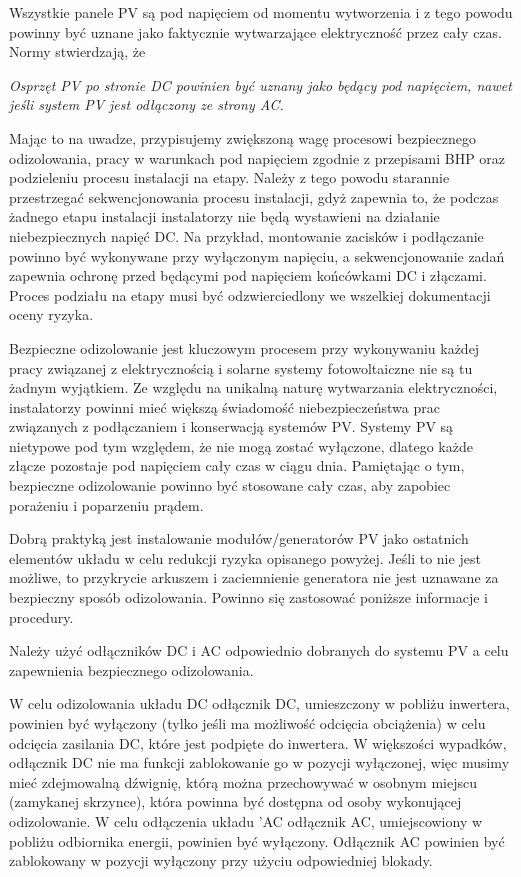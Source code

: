 \documentclass[12pt,a4paper]{article}
\begin{document}
Wszystkie panele PV są pod napięciem od momentu wytworzenia i z tego 
powodu powinny być uznane jako faktycznie wytwarzające elektryczność 
przez cały czas. Normy stwierdzają, że 
\begin{displayquote}
\textit{Osprzęt PV po stronie DC powinien być uznany jako będący pod napięciem, nawet jeśli system PV jest odłączony ze strony AC.}
\end{displayquote}
Mając to na uwadze, przypisujemy 
zwiększoną wagę procesowi bezpiecznego odizolowania, pracy w warunkach 
pod napięciem zgodnie z przepisami BHP oraz podzieleniu procesu 
instalacji na etapy. Należy z tego powodu starannie przestrzegać 
sekwencjonowania procesu instalacji, gdyż zapewnia to, że podczas 
żadnego etapu instalacji instalatorzy nie będą wystawieni na działanie niebezpiecznych napięć DC. 
Na przykład, montowanie zacisków i podłączanie powinno być wykonywane 
przy wyłączonym napięciu, a sekwencjonowanie zadań zapewnia ochronę 
przed będącymi pod napięciem końcówkami DC i złączami. Proces podziału 
na etapy musi być odzwierciedlony we wszelkiej dokumentacji oceny 
ryzyka. 

 

Bezpieczne odizolowanie jest kluczowym procesem przy wykonywaniu każdej 
pracy związanej z elektrycznością i solarne systemy fotowoltaiczne nie 
są tu żadnym wyjątkiem. Ze względu na unikalną naturę wytwarzania 
elektryczności, instalatorzy powinni mieć większą świadomość 
niebezpieczeństwa prac związanych z podłączaniem i konserwacją systemów 
PV. Systemy PV są nietypowe pod tym względem, że nie mogą zostać 
wyłączone, dlatego każde złącze pozostaje pod napięciem cały czas w 
ciągu dnia. Pamiętając o tym, bezpieczne odizolowanie powinno być 
stosowane cały czas, aby zapobiec porażeniu i poparzeniu prądem. 

Dobrą praktyką jest instalowanie modułów/generatorów PV jako ostatnich 
elementów układu w celu redukcji ryzyka opisanego powyżej. Jeśli to nie 
jest możliwe, to przykrycie arkuszem i zaciemnienie generatora nie jest 
uznawane za bezpieczny sposób odizolowania. Powinno się zastosować 
poniższe informacje i procedury. 

Należy użyć odłączników DC i AC odpowiednio dobranych do systemu PV a 
celu zapewnienia bezpiecznego odizolowania. 

W celu odizolowania układu DC odłącznik DC, umieszczony w pobliżu 
inwertera, powinien być wyłączony (tylko jeśli ma możliwość odcięcia 
obciążenia) w celu odcięcia zasilania DC, które jest podpięte do 
inwertera. W większości wypadków, odłącznik DC nie ma funkcji 
zablokowanie go w pozycji wyłączonej, więc musimy mieć zdejmowalną 
dźwignię, którą można przechowywać w osobnym miejscu (zamykanej 
skrzynce), która powinna być dostępna od osoby wykonującej odizolowanie. 
W celu odłączenia układu 'AC odłącznik AC, umiejscowiony w pobliżu 
odbiornika energii, powinien być wyłączony. Odłącznik AC powinien być 
zablokowany w pozycji wyłączony przy użyciu odpowiedniej blokady. 
\end{document}
